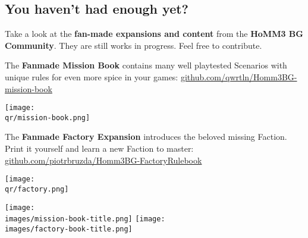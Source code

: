 \begin{multicols}{2}
\subsection*{You haven't had enough yet?}
Take a look at the \textbf{fan-made expansions and content} from the \textbf{HoMM3 BG Community}.
They are still works in progress.
Feel free to contribute.
  \begin{itemize}
    \begin{minipage}{5cm}
      \item The \textbf{Fanmade Mission Book} contains many well playtested Scenarios with unique rules for even more spice in your games:
      \mbox{\footnotesize \href{https://github.com/qwrtln/Homm3BG-mission-book}{github.com/qwrtln/Homm3BG-mission-book}}
    \end{minipage}
    \hfill
    \begin{minipage}{2cm}
        \begin{center}
            \texttt{[image: \\qr/mission-book.png]}
            \scriptsize {}
        \end{center}
    \end{minipage}\par
    \smallskip
    \begin{minipage}{5cm}
      \item The \textbf{Fanmade Factory Expansion} introduces the beloved missing Faction.
      Print it yourself and learn a new Faction to master:
      {\footnotesize \href{https://github.com/piotrbruzda/Homm3BG-FactoryRulebook}{github.com/piotrbruzda/Homm3BG-FactoryRulebook}}
    \end{minipage}
    \hfill
    \begin{minipage}{2cm}
        \begin{center}
            \vspace*{-1em}
            \texttt{[image: \\qr/factory.png]}
            \scriptsize {}
        \end{center}
    \end{minipage}\par
    \smallskip
  \end{itemize}
  \begin{center}
    \hfill
    \texttt{[image: \\images/mission-book-title.png]}
    \texttt{[image: \\images/factory-book-title.png]}
  \end{center}
  \begin{itemize}

\end{itemize}
\end{multicols}
